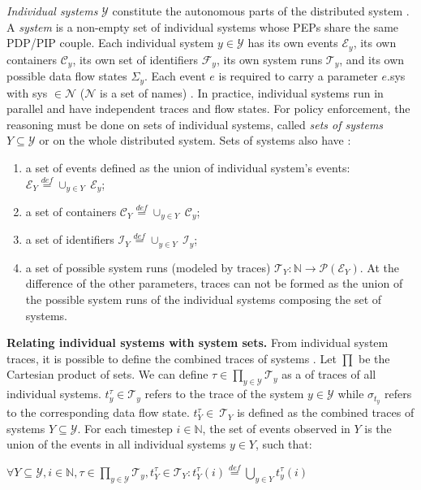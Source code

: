 \emph{Individual systems} $\mathcal{Y}$ constitute the autonomous parts of the distributed system \cite{Kelbert2018}. A \emph{system} is a non-empty set of individual systems whose PEPs share the same PDP/PIP couple. Each individual system $y \in \mathcal{Y}$ has its own events $\mathcal{E}_{y}$, its own containers $\mathcal{C}_{y}$, its own set of identifiers $\mathcal{F}_{y}$, its own system runs $\mathcal{T}_{y}$, and its own possible data flow states $\Sigma_{y}$. Each event $e$ is required to carry a parameter $e$.sys with sys $\in \mathcal{N}$ ($\mathcal{N}$ is a set of names) . In practice, individual systems run in parallel and have independent traces and flow states. 
 For policy enforcement, the reasoning must be done on sets of individual systems, called \emph{sets of systems} $Y \subseteq \mathcal{Y}$ or on the whole distributed system. Sets of systems also have : 
 \begin{enumerate}
 \item a set of events defined as the union of individual system's events: $\mathcal{E}_Y \overset{def}{=} \cup_{y \in Y} \ \mathcal{E}_{y} $;
 \item a set of containers $\mathcal{C}_Y \overset{def}{=} \cup_{y \in Y} \ \mathcal{C}_{y} $;
 \item a set of identifiers $\mathcal{I}_Y \overset{def}{=} \cup_{y \in Y} \ \mathcal{I}_{y} $; 
 \item a set of possible system runs (modeled by traces) $\mathcal{T}_Y : \mathbb{N} \to \mathcal{P}(\mathcal{E}_{Y})$. At the difference of the other parameters, traces can not be formed as the union of the possible system runs of the individual systems composing the set of systems. 
 \end{enumerate}
\textbf{Relating individual systems with system sets.}
From individual system traces, it is possible to define the combined traces of systems \cite{Kelbert2018}. Let $\prod$ be the Cartesian product of sets. We can define $\tau \in \prod_{y \in \mathcal{Y}}\mathcal{T}_{y} $ as a  of traces of all individual systems. $t_{y}^{\tau} \in \mathcal{T}_{y}$ refers to the trace of the system $y \in \mathcal{Y}$ while $\sigma_{t_y}$ refers to the corresponding data flow state. $t_{Y}^{\tau} \in \ \mathcal{T}_{Y}$ is defined as the combined traces of systems $Y \subseteq \mathcal{Y}$. For each timestep $i \in \mathbb{N}$, the set of events observed in $Y$ is the union of the events in all individual systems $y \in Y$, such that: 
\begin{center}
$\forall Y \subseteq \mathcal{Y}, i \in \mathbb{N}, \tau \in \prod_{y \in \mathcal{Y}}\mathcal{T}_{y}, t_{Y}^{\tau} \in \mathcal{T}_{Y} : t_{Y}^{\tau}(i) \overset{def}{=} \bigcup_{y \in Y}t_{y}^{\tau}(i)$
\end{center}
